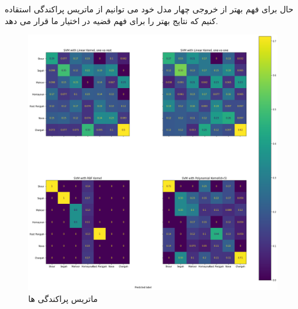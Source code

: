 \documentclass{article}
\begin{document}
حال برای فهم بهتر از خروجی چهار مدل خود می توانیم از ماتریس پراکندگی استقاده کنیم که نتایج بهتر را برای فهم قضیه در اختیار ما قرار می دهد.\newline
\begin{figure}[h]
	\centering
	\includegraphics[width=0.7\linewidth]{Photo/20}
	\caption[ماتریس پراکندگی  ها]{ماتریس پراکندگی  ها}
	\label{fig:20}
\end{figure}
\end{document}
